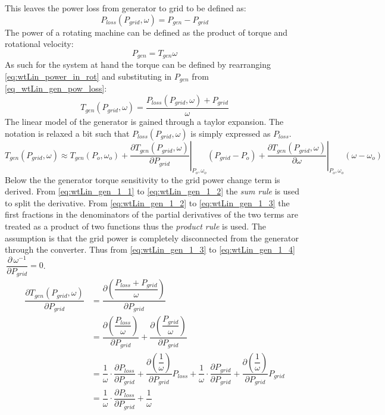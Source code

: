 This leaves the power loss from generator to grid to be defined as:
\begin{equation} \label{eq_wtLin_gen_pow_loss}
	P_{loss}(P_{grid}, \omega) = P_{gen} - P_{grid}%
\end{equation}
The power of a rotating machine can be defined as the product of torque and rotational velocity:
\begin{equation}\label{eq:wtLin_power_in_rot}
	P_{gen} = T_{gen} \omega
\end{equation}
As such for the system at hand the torque can be defined by rearranging \cref{eq:wtLin_power_in_rot} and substituting in $ P_{gen} $ from \cref{eq_wtLin_gen_pow_loss}:
\begin{equation}\label{key}
	T_{gen}(P_{grid}, \omega) = \dfrac{P_{loss}(P_{grid}, \omega) + P_{grid}}{\omega}
\end{equation}
The linear model of the generator is gained through a taylor expansion. The notation is relaxed a bit such that $ P_{loss}( P_{grid}, \omega) $ is simply expressed as $ P_{loss} $.
\begin{equation}\label{eq:wtLin_taylor}
	T_{gen}( P_{grid}, \omega) \approx T_{gen}(P_o, \omega_o) + 
	\left. \dfrac{\partial T_{gen}( P_{grid}, \omega)}{\partial P_{grid}} \right |_{P_o,\omega_o} ( P_{grid}-P_o) + 
	\left. \dfrac{\partial T_{gen}( P_{grid}, \omega)}{\partial \omega} \right |_{P_o,\omega_o} (\omega - \omega_o)
\end{equation}
Below the the generator torque sensitivity to the grid power change term is derived. From \cref{eq:wtLin_gen_1_1} to \cref{eq:wtLin_gen_1_2} the \textit{sum rule} is used to split the derivative. From \cref{eq:wtLin_gen_1_2} to \cref{eq:wtLin_gen_1_3} the first fractions in the denominators of the partial derivatives of the two terms are treated as a product of two functions thus the \textit{product rule} is used. The assumption is that the grid power is completely disconnected from the generator through the converter. Thus from \cref{eq:wtLin_gen_1_3} to \cref{eq:wtLin_gen_1_4} $ \, \dfrac{\partial \, \omega^{-1}}{\partial P_{grid}} = 0 $.
\begin{align} 
	\dfrac{\partial T_{gen}( P_{grid}, \omega)}{\partial P_{grid}} &= \dfrac{\partial \left (\dfrac{P_{loss} +  P_{grid}}{\omega}\right )}{\partial P_{grid}} \label{eq:wtLin_gen_1_1} \\
	& = \dfrac{\partial \left (\dfrac{P_{loss}}{\omega} \right )}{\partial P_{grid}} + \dfrac{\partial \left ( \dfrac{ P_{grid}}{\omega} \right )}{\partial P_{grid}} \label{eq:wtLin_gen_1_2} \\
	& = \dfrac{1}{\omega} \cdot \dfrac{\partial P_{loss}}{\partial P_{grid}} + \dfrac{\partial \left ( \dfrac{1}{\omega} \right )}{\partial P_{grid}} P_{loss} + \dfrac{1}{\omega} \cdot \dfrac{\partial P_{grid}}{\partial P_{grid}} + \dfrac{\partial \left (\dfrac{1}{\omega} \right )}{\partial P_{grid}}  P_{grid} \label{eq:wtLin_gen_1_3} \\
	& = \dfrac{1}{\omega} \cdot \dfrac{\partial P_{loss}}{\partial P_{grid}} + \dfrac{1}{\omega} \label{eq:wtLin_gen_1_4}
\end{align}

